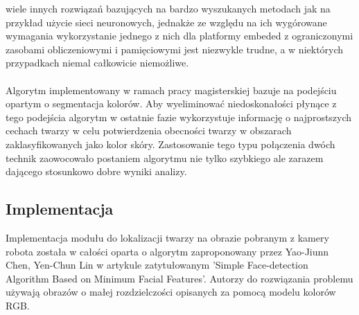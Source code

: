 wiele innych rozwiązań bazujących na bardzo wyszukanych metodach jak na przykład
użycie sieci neuronowych, jednakże ze względu na ich wygórowane wymagania
wykorzystanie jednego z nich dla platformy embeded z ograniczonymi zasobami
obliczeniowymi i pamięciowymi jest niezwykle trudne, a w niektórych przypadkach
niemal całkowicie niemożliwe.\\
\\
Algorytm implementowany w ramach pracy magisterskiej bazuje na podejściu opartym
o segmentacja kolorów. Aby wyeliminować niedoskonałości płynące z tego podejścia
algorytm w ostatnie fazie wykorzystuje informację o najprostszych cechach twarzy
w celu potwierdzenia obecności twarzy w obszarach zaklasyfikowanych jako kolor
skóry. Zastosowanie tego typu połączenia dwóch technik zaowocowało postaniem
algorytmu nie tylko szybkiego ale zarazem dającego stosunkowo dobre wyniki
analizy.

\subsection{Implementacja}
Implementacja modułu do lokalizacji twarzy na obrazie pobranym z kamery robota
została w całości oparta o algorytm zaproponowany przez Yao-Jiunn Chen, Yen-Chun
Lin w artykule zatytułowanym 'Simple Face-detection Algorithm Based on Minimum
Facial Features'. Autorzy do rozwiązania problemu używają obrazów o małej
rozdzielczości opisanych za pomocą modelu kolorów RGB. 

